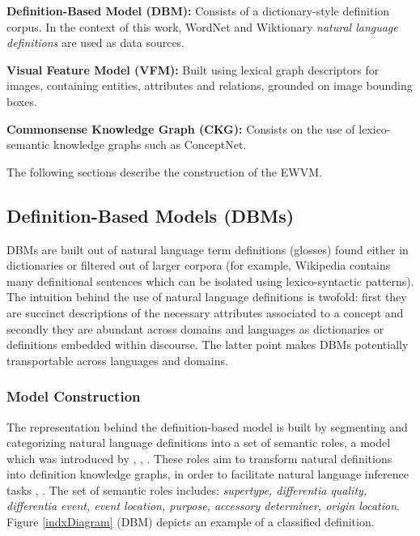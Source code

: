\documentclass[11pt,a4paper]{article}
\begin{document}
\noindent \textbf{Definition-Based Model (DBM):} Consists of a dictionary-style definition corpus. In the context of this work, WordNet and Wiktionary \textit{natural language definitions} are used as data sources.

\noindent \textbf{Visual Feature Model (VFM):} Built using lexical graph descriptors for images, containing entities, attributes and relations, grounded on image bounding boxes.

\noindent \textbf{Commonsense Knowledge Graph (CKG):} Consists on the use of lexico-semantic knowledge graphs such as ConceptNet.

\noindent The following sections describe the construction of the EWVM.

\subsection{Definition-Based Models (DBMs)}

DBMs are built out of natural language term definitions (glosses) found either in dictionaries or filtered out of larger corpora (for example, Wikipedia contains many definitional sentences which can be isolated using lexico-syntactic patterns). The intuition behind the use of natural language definitions is twofold: first they are succinct descriptions of the necessary attributes associated to a concept and secondly they are abundant across domains and languages as dictionaries or definitions embedded within discourse. The latter point makes DBMs potentially transportable across languages and domains.

\subsubsection{Model Construction}

The representation behind the definition-based model is built by segmenting and categorizing natural language definitions into a set of semantic roles, a model which was introduced by , , . These roles aim to transform natural definitions into definition knowledge graphs, in order to facilitate natural language inference tasks \cite{silva:2}, \cite{VivianComp}. The set of semantic roles includes: \emph{supertype, differentia quality, differentia event, event location, purpose, accessory determiner, origin location}. Figure \ref{indxDiagram} (DBM) depicts an example of a classified definition. 
\end{document}
